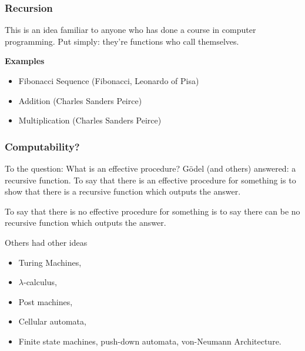 \documentclass{beamer}
\begin{document}
\begin{frame}
	\frametitle{Recursion}
	
	This is an idea familiar to anyone who has done a course in computer programming. Put simply: they're functions who call themselves. 
	
	\vspace{0.5cm}
	
	{\bf Examples}
	
	\begin{itemize}
		\item Fibonacci Sequence (Fibonacci, Leonardo of Pisa)
		\item Addition (Charles Sanders Peirce)
		\item Multiplication (Charles Sanders Peirce)
	\end{itemize}

	\vspace{4cm}

	
\end{frame}

\begin{frame}
	\frametitle{Computability?}
	
	To the question: What is an effective procedure? G\"{o}del (and others) answered: a recursive function. To say that there is an effective procedure for something is to show that there is a recursive function which outputs the answer. 
	
	\vspace{0.5cm} 
	
	To say that there is no effective procedure for something is to say there can be no recursive function which outputs the answer. 
	
	\vspace{0.5cm} 
	
	Others had other ideas
	
	\begin{itemize}
		\item Turing Machines, 
		\item $\lambda$-calculus, 
		\item Post machines, 
		\item Cellular automata, 
		\item Finite state machines, push-down automata, von-Neumann Architecture.		
	\end{itemize}
	
\end{frame}
\end{document}

